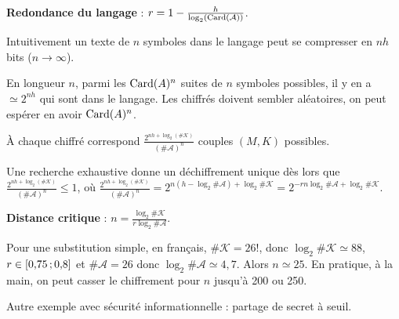 	\begin{defn}
		\textbf{Redondance du langage} : $r = 1 - \frac{h}{\log_2(\operatorname{Card}(\mathcal{A}))}$.
	\end{defn}
	
	Intuitivement un texte de $n$ symboles dans le langage peut se compresser en $nh$ bits ($n \to \infty$).
	
	En longueur $n$, parmi les $\operatorname{Card}(A)^n$ suites de $n$ symboles possibles, il y en a $\simeq 2^{nh}$ qui sont dans le langage.
	Les chiffrés doivent sembler aléatoires, on peut espérer en avoir $\operatorname{Card}(A)^n$.
	
	À chaque chiffré correspond $\displaystyle \frac{2^{nh + \log_2(\# \mathcal{K})}}{(\# \mathcal{A})^n}$ couples $(M,K)$ possibles.
	
	Une recherche exhaustive donne un déchiffrement unique dès lors que $\frac{2^{nh + \log_2(\# \mathcal{K})}}{(\# \mathcal{A})^n} \leq 1$, où $\frac{2^{nh + \log_2(\# \mathcal{K})}}{(\# \mathcal{A})^n} = 2^{n(h - \log_2 \# \mathcal{A}) + \log_2 \# \mathcal{K}} = 2^{-rn \log_2 \# \mathcal{A} + \log_2 \# \mathcal{K}}$.
	
	\begin{defn}
		\textbf{Distance critique} : $n = \frac{\log_2 \# \mathcal{K}}{r \log_2 \# \mathcal{A}}$.
	\end{defn}
	
	\begin{ex}
		Pour une substitution simple, en français, $\# \mathcal{K} = 26!$, donc $\log_2 \# \mathcal{K} \simeq 88$, $r \in \mathopen{[}0{,}75\mathclose{}\mathpunct{};0{,}8\mathclose{]}$ et $\# \mathcal{A} = 26$ donc $\log_2 \# \mathcal{A} \simeq 4{,}7$.
		Alors $n \simeq 25$.
		En pratique, à la main, on peut casser le chiffrement pour $n$ jusqu'à 200 ou 250.
	\end{ex}
	
	Autre exemple avec sécurité informationnelle : partage de secret à seuil.
	
